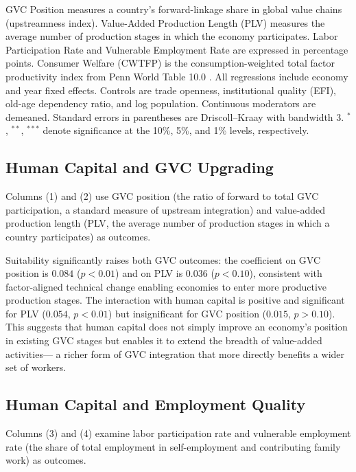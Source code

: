 \documentclass[12pt]{article}
\begin{document}
\begin{table}[H]
\begin{threeparttable}
\begin{tablenotes}
GVC Position measures a country's forward-linkage share in global
value chains (upstreamness index).
Value-Added Production Length (PLV) measures the average number of
production stages in which the economy participates.
Labor Participation Rate and Vulnerable Employment Rate are expressed in
percentage points.
Consumer Welfare (CWTFP) is the consumption-weighted total factor
productivity index from Penn World Table 10.0
\citep{feenstra2015next}.
All regressions include economy and year fixed effects.
Controls are trade openness, institutional quality (EFI),
old-age dependency ratio, and log population.
Continuous moderators are demeaned.
Standard errors in parentheses are Driscoll--Kraay
\citep{driscoll1998consistent} with bandwidth 3.
$^{*}$, $^{**}$, $^{***}$ denote significance at the 10\%, 5\%,
and 1\% levels, respectively.
\end{tablenotes}
\end{threeparttable}
\end{table}

\subsection{Human Capital and GVC Upgrading}

Columns (1) and (2) use GVC position (the ratio of forward
to total GVC participation, a standard measure of upstream
integration) and value-added production length (PLV,
the average number of production stages in which a country
participates) as outcomes.

Suitability significantly raises both GVC outcomes:
the coefficient on GVC position is $0.084$ ($p < 0.01$)
and on PLV is $0.036$ ($p < 0.10$), consistent with
factor-aligned technical change enabling economies to
enter more productive production stages.
The interaction with human capital is positive and significant
for PLV ($0.054$, $p < 0.01$) but insignificant for
GVC position ($0.015$, $p > 0.10$).
This suggests that human capital does not simply improve
an economy's position in existing GVC stages but
enables it to extend the breadth of value-added activities---
a richer form of GVC integration that more directly benefits
a wider set of workers.

\subsection{Human Capital and Employment Quality}

Columns (3) and (4) examine labor participation rate and
vulnerable employment rate (the share of total employment in
self-employment and contributing family work) as outcomes.
\end{document}

